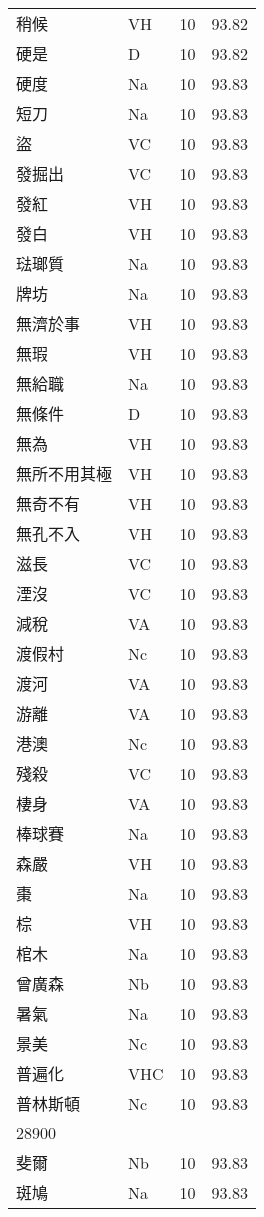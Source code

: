 \documentclass[twocolumn]{book}
\begin{document}
\begin{supertabular}{llrr}
稍候 & VH & 10 &  93.82\\
硬是 & D & 10 &  93.82\\
硬度 & Na & 10 &  93.83\\
短刀 & Na & 10 &  93.83\\
盜 & VC & 10 &  93.83\\
發掘出 & VC & 10 &  93.83\\
發紅 & VH & 10 &  93.83\\
發白 & VH & 10 &  93.83\\
琺瑯質 & Na & 10 &  93.83\\
牌坊 & Na & 10 &  93.83\\
無濟於事 & VH & 10 &  93.83\\
無瑕 & VH & 10 &  93.83\\
無給職 & Na & 10 &  93.83\\
無條件 & D & 10 &  93.83\\
無為 & VH & 10 &  93.83\\
無所不用其極 & VH & 10 &  93.83\\
無奇不有 & VH & 10 &  93.83\\
無孔不入 & VH & 10 &  93.83\\
滋長 & VC & 10 &  93.83\\
湮沒 & VC & 10 &  93.83\\
減稅 & VA & 10 &  93.83\\
渡假村 & Nc & 10 &  93.83\\
渡河 & VA & 10 &  93.83\\
游離 & VA & 10 &  93.83\\
港澳 & Nc & 10 &  93.83\\
殘殺 & VC & 10 &  93.83\\
棲身 & VA & 10 &  93.83\\
棒球賽 & Na & 10 &  93.83\\
森嚴 & VH & 10 &  93.83\\
棗 & Na & 10 &  93.83\\
棕 & VH & 10 &  93.83\\
棺木 & Na & 10 &  93.83\\
曾廣森 & Nb & 10 &  93.83\\
暑氣 & Na & 10 &  93.83\\
景美 & Nc & 10 &  93.83\\
普遍化 & VHC & 10 &  93.83\\
普林斯頓 & Nc & 10 &  93.83\\
28900\\
斐爾 & Nb & 10 &  93.83\\
斑鳩 & Na & 10 &  93.83\\

\end{supertabular}
\end{document}
